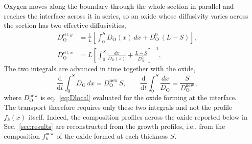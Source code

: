 \documentclass[3p,times]{elsarticle} %
\newcommand{\eff}{\mathrm{eff}}
\newcommand{\Ox}{\mathrm{O}}           %
\begin{document}
Oxygen moves along the boundary through the whole section in parallel and
reaches the interface across it in series, so an oxide whose diffusivity
varies across the section has two effective diffusivities,
\begin{equation}
\begin{aligned}
D_{\Ox}^{\eff,y}&=\frac{1}{L}\left[\int_{0}^{S} D_{\Ox}(x)\,dx
                     +D_{\Ox}^{0}\,(L-S)\right],\\
D_{\Ox}^{\eff,x}&=L\left[\int_{0}^{S}\frac{dx}{D_{\Ox}(x)}
                     +\frac{L-S}{D_{\Ox}^{0}}\right]^{-1},
\end{aligned}
\label{eq:Deff}
\end{equation}
The two integrals are advanced in time together with the oxide,
\begin{equation}
\frac{\mathrm{d}}{\mathrm{d}t}\int_{0}^{S} D_{\Ox}\,dx
 = D_{\Ox}^{\mathrm{new}}\,\dot{S},
\qquad
\frac{\mathrm{d}}{\mathrm{d}t}\int_{0}^{S}\frac{dx}{D_{\Ox}}
 = \frac{\dot{S}}{D_{\Ox}^{\mathrm{new}}},
\label{eq:Dint}
\end{equation}
where \(D_{\Ox}^{\mathrm{new}}\) is eq.~\eqref{eq:Dlocal} evaluated for the
oxide forming at the interface. The transport therefore requires only these
two integrals and not the profile \(f_k(x)\) itself. Indeed, the composition profiles
across the oxide reported below in Sec.~\ref{sec:results} are reconstructed from
the growth profiles, i.e., from the composition \(f_k^{\mathrm{new}}\) of the
oxide formed at each thickness \(S\).
\end{document}
